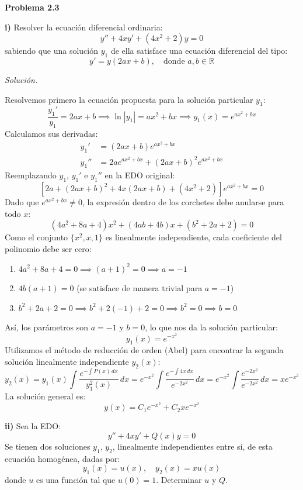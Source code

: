 \documentclass[12pt,letterpaper]{article}
\begin{document}
\bigskip

\textbf{Problema 2.3}

\medskip
\textbf{i)} Resolver la ecuación diferencial ordinaria:
\[
  y'' + 4xy' + (4x^2 + 2)y = 0
\]
sabiendo que una solución $y_1$ de ella satisface una ecuación diferencial del tipo:
\[
  y' = y(2ax + b), \quad \text{donde } a, b \in \mathbb{R}
\]

\medskip
\textit{Solución.}

Resolvemos primero la ecuación propuesta para la solución particular $y_1$:
\[
  \frac{y_1'}{y_1} = 2ax + b \implies \ln|y_1| = ax^2 + bx \implies y_1(x) = e^{ax^2 + bx}
\]
Calculamos sus derivadas:
\begin{align*}
  y_1' &= (2ax + b) e^{ax^2 + bx} \\
  y_1'' &= 2a e^{ax^2 + bx} + (2ax + b)^2 e^{ax^2 + bx}
\end{align*}
Reemplazando $y_1$, $y_1'$ e $y_1''$ en la EDO original:
\[
  \left[ 2a + (2ax + b)^2 + 4x(2ax + b) + (4x^2 + 2) \right] e^{ax^2 + bx} = 0
\]
Dado que $e^{ax^2 + bx} \neq 0$, la expresión dentro de los corchetes debe anularse para todo $x$:
\[
  (4a^2 + 8a + 4)x^2 + (4ab + 4b)x + (b^2 + 2a + 2) = 0
\]
Como el conjunto $\{x^2, x, 1\}$ es linealmente independiente, cada coeficiente del polinomio debe ser cero:
\begin{enumerate}
  \item $4a^2 + 8a + 4 = 0 \implies (a + 1)^2 = 0 \implies a = -1$
  \item $4b(a + 1) = 0$ (se satisface de manera trivial para $a = -1$)
  \item $b^2 + 2a + 2 = 0 \implies b^2 + 2(-1) + 2 = 0 \implies b^2 = 0 \implies b = 0$
\end{enumerate}
Así, los parámetros son $a = -1$ y $b = 0$, lo que nos da la solución particular:
\[
  y_1(x) = e^{-x^2}
\]
Utilizamos el método de reducción de orden (Abel) para encontrar la segunda solución linealmente independiente $y_2(x)$:
\[
  y_2(x) = y_1(x) \int \frac{e^{-\int P(x)\,dx}}{y_1^2(x)}\,dx = e^{-x^2} \int \frac{e^{-\int 4x\,dx}}{e^{-2x^2}}\,dx = e^{-x^2} \int \frac{e^{-2x^2}}{e^{-2x^2}}\,dx = x e^{-x^2}
\]
La solución general es:
\[
  y(x) = C_1 e^{-x^2} + C_2 x e^{-x^2}
\]

\medskip
\textbf{ii)} Sea la EDO:
\[
  y'' + 4xy' + Q(x)y = 0
\]
Se tienen dos soluciones $y_1$, $y_2$, linealmente independientes entre sí, de esta ecuación homogénea, dadas por:
\[
  y_1(x) = u(x), \quad y_2(x) = xu(x)
\]
donde $u$ es una función tal que $u(0) = 1$. Determinar $u$ y $Q$.
\end{document}
